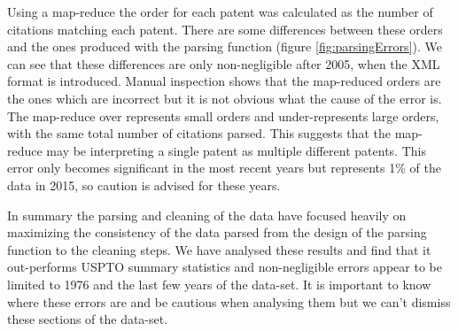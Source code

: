 Using a map-reduce the order for each patent was calculated as the number of citations matching each patent. There are some differences between these orders and the ones produced with the parsing function (figure \ref{fig:parsingErrors}).  We can see that these differences are only non-negligible after 2005, when the XML format is introduced. Manual inspection shows that the map-reduced orders are the ones which are incorrect but it is not obvious what the cause of the error is. The map-reduce over represents small orders and under-represents large orders, with the same total number of citations parsed. This suggests that the map-reduce may be interpreting a single patent as multiple different patents. This error only becomes significant in the most recent years but represents 1\% of the data in 2015, so caution is advised for these years. 

In summary the parsing and cleaning of the data have focused heavily on maximizing the consistency of the data parsed from the design of the parsing function to the cleaning steps. We have analysed these results and find that it out-performs USPTO summary statistics and non-negligible errors appear to be limited to 1976 and the last few years of the data-set. It is important to know where these errors are and be cautious when analysing them but we can't dismiss these sections of the data-set.